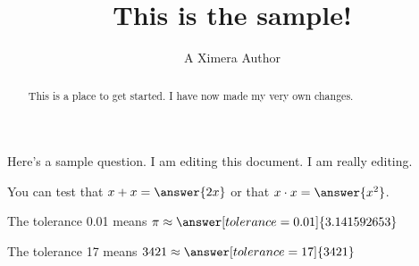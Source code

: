 \documentclass{ximera}
\title{This is the sample!}
\author{A Ximera Author}
\begin{document}
\maketitle

\begin{abstract}
  This is a place to get started.
  I have now made my very own changes.
\end{abstract}


Here's a sample question.  I am editing this document.  I am really editing.

\begin{problem}
\begin{multipleChoice}
\end{multipleChoice}
\end{problem}

\begin{problem}
   You can test that $x + x = \answer{2x}$ or that $x \cdot x = \answer{x^2}$.
\end{problem}

\begin{problem}
   The tolerance 0.01 means $\pi \approx \answer[tolerance=0.01]{3.141592653}$
\end{problem}

\begin{problem}
   The tolerance 17 means $3421 \approx \answer[tolerance=17]{3421}$
\end{problem}
\end{document}

